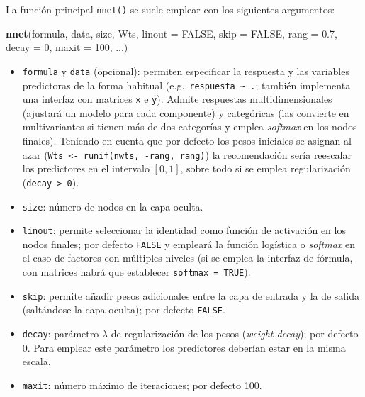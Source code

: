 \documentclass[
]{book}
\newenvironment{Shaded}{\begin{snugshade}}{\end{snugshade}}
\newcommand{\DataTypeTok}[1]{\textcolor[rgb]{0.13,0.29,0.53}{#1}}
\newcommand{\DecValTok}[1]{\textcolor[rgb]{0.00,0.00,0.81}{#1}}
\newcommand{\FloatTok}[1]{\textcolor[rgb]{0.00,0.00,0.81}{#1}}
\newcommand{\KeywordTok}[1]{\textcolor[rgb]{0.13,0.29,0.53}{\textbf{#1}}}
\newcommand{\NormalTok}[1]{#1}
\newcommand{\OtherTok}[1]{\textcolor[rgb]{0.56,0.35,0.01}{#1}}
\theoremstyle{break}
\theoremstyle{definition}
\theoremstyle{definition}
\theoremstyle{definition}
\theoremstyle{remark}
\begin{document}
La función principal \texttt{nnet()} se suele emplear con los siguientes argumentos:

\begin{Shaded}
\begin{Highlighting}[]
\KeywordTok{nnet}\NormalTok{(formula, data, size, Wts, }\DataTypeTok{linout =} \OtherTok{FALSE}\NormalTok{, }\DataTypeTok{skip =} \OtherTok{FALSE}\NormalTok{, }
     \DataTypeTok{rang =} \FloatTok{0.7}\NormalTok{, }\DataTypeTok{decay =} \DecValTok{0}\NormalTok{, }\DataTypeTok{maxit =} \DecValTok{100}\NormalTok{, ...)}
\end{Highlighting}
\end{Shaded}

\begin{itemize}
\item
  \texttt{formula} y \texttt{data} (opcional): permiten especificar la respuesta y las variables predictoras de la forma habitual (e.g.~\texttt{respuesta\ \textasciitilde{}\ .}; también implementa una interfaz con matrices \texttt{x} e \texttt{y}). Admite respuestas multidimensionales (ajustará un modelo para cada componente) y categóricas (las convierte en multivariantes si tienen más de dos categorías y emplea \emph{softmax} en los nodos finales).
  Teniendo en cuenta que por defecto los pesos iniciales se asignan al azar (\texttt{Wts\ \textless{}-\ runif(nwts,\ -rang,\ rang)}) la recomendación sería reescalar los predictores en el intervalo \([0, 1]\), sobre todo si se emplea regularización (\texttt{decay\ \textgreater{}\ 0}).
\item
  \texttt{size}: número de nodos en la capa oculta.
\item
  \texttt{linout}: permite seleccionar la identidad como función de activación en los nodos finales; por defecto \texttt{FALSE} y empleará la función logística o \emph{softmax} en el caso de factores con múltiples niveles (si se emplea la interfaz de fórmula, con matrices habrá que establecer \texttt{softmax\ =\ TRUE}).
\item
  \texttt{skip}: permite añadir pesos adicionales entre la capa de entrada y la de salida (saltándose la capa oculta); por defecto \texttt{FALSE}.
\item
  \texttt{decay}: parámetro \(\lambda\) de regularización de los pesos (\emph{weight decay}); por defecto 0. Para emplear este parámetro los predictores deberían estar en la misma escala.
\item
  \texttt{maxit}: número máximo de iteraciones; por defecto 100.
\end{itemize}
\end{document}
